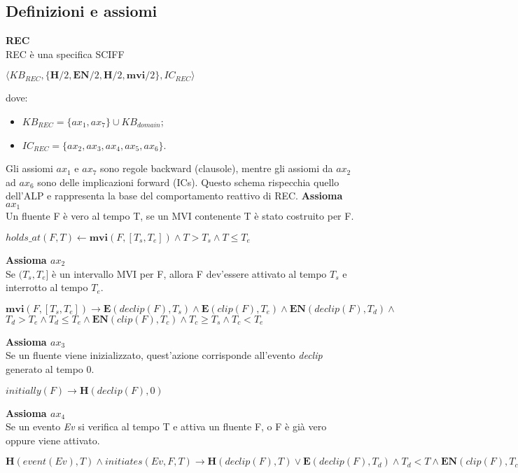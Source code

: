 \documentclass[a4paper,12pt]{report}
\begin{document}
\subsection{Definizioni e assiomi}
\textbf{REC}\\
REC è una specifica SCIFF
\begin{center}
$\langle KB_{REC},\{\textbf{H}/2,\textbf{EN}/2,\textbf{H}/2,\textbf{mvi}/2\},IC_{REC}\rangle$
\end{center}
dove:
\begin{itemize}
 \item \textit{$KB_{REC}=\{ax_1,ax_7\}\cup KB_{domain}$};
 \item \textit{$IC_{REC}=\{ax_2,ax_3,ax_4,ax_5,ax_6\}$}.
\end{itemize}
Gli assiomi $ax_1$ e $ax_7$ sono regole backward (clausole), mentre gli assiomi da $ax_2$ ad $ax_6$ sono delle implicazioni forward (ICs). Questo schema rispecchia quello dell'ALP e rappresenta la base del comportamento reattivo di REC.
\newpage
\textbf{Assioma $ax_1$}\\
Un fluente F è vero al tempo T, se un MVI contenente T è stato costruito per F.
\begin{center}
$holds\_at(F,T)\leftarrow \textbf{mvi}(F,[T_s,T_e])\wedge T>T_s\wedge T\leq T_e$
\end{center}
\textbf{Assioma $ax_2$}\\
Se $(T_s,T_e]$ è un intervallo MVI per F, allora F dev'essere attivato al tempo $T_s$ e interrotto al tempo $T_e$.
\begin{center}
$\textbf{mvi}(F,[T_s,T_e])\rightarrow \textbf{E}(declip(F),T_s)\wedge \textbf{E}(clip(F),T_e)\wedge \textbf{EN}(declip(F),T_d)\wedge$\\$ T_d>T_e\wedge T_d\leq T_e\wedge \textbf{EN}(clip(F),T_c)\wedge T_c\geq T_s\wedge T_c<T_e$
\end{center}
\textbf{Assioma $ax_3$}\\
Se un fluente viene inizializzato, quest'azione corrisponde all'evento \textit{declip} generato al tempo 0.
\begin{center}
$initially(F)\rightarrow \textbf{H}(declip(F),0)$
\end{center}
\textbf{Assioma $ax_4$}\\
Se un evento \textit{Ev} si verifica al tempo T e attiva un fluente F, o F è già vero oppure viene attivato.
\begin{center}
$\textbf{H}(event(Ev),T)\wedge initiates(Ev,F,T)\rightarrow \textbf{H}(declip(F),T)\vee \textbf{E}(declip(F),T_d)\wedge T_d<T\wedge \textbf{EN}(clip(F),T_c)\wedge T_c>T_d\wedge T_c<T$
\end{center}
\end{document}
